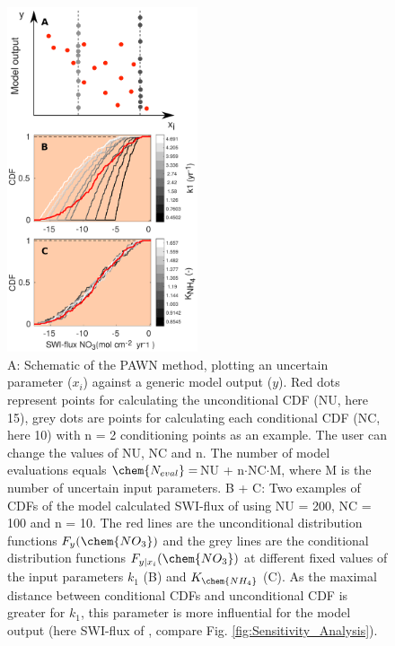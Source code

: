 \documentclass[gmd, manuscript]{copernicus}
\begin{document}
\begin{figure}[htbp]
\begin{center}
	\includegraphics[width=0.5\textwidth]{figures/SA/00_CDFs_400m_NO_3_1807.pdf}
	\caption{A: Schematic of the PAWN method, plotting an uncertain parameter ($x_i$) against a generic model output ($y$). 
	Red dots represent points for calculating the unconditional CDF (NU, here 15), grey dots are points for calculating each conditional CDF (NC, here 10) 
	with n = 2 conditioning points as an example. The user can change the values of NU, NC and n. The number of model evaluations equals $\chem{N_{eval}} = $NU + n$\cdot$NC$\cdot$M, 
	where M is the number of uncertain input parameters. 
	B + C: Two examples of CDFs of the model calculated SWI-flux of  using NU = 200, NC = 100 and n = 10. 
	The red lines are the unconditional distribution functions $F_y(\chem{NO_3})$ and the grey lines are the conditional distribution functions $F_{y|x_i}(\chem{NO_3})$ 
	at different fixed values of the input parameters $k_1$ (B) and $K_{\chem{NH_4}}$ (C). 
	As the maximal distance between conditional CDFs and unconditional CDF is greater for $k_1$, this parameter is more influential for the model output 
	(here SWI-flux of , compare Fig. \ref{fig:Sensitivity_Analysis}). 
	}
	\label{fig:Sensitivity_Analysis_methodology}
	\end{center}
\end{figure}
\end{document}
